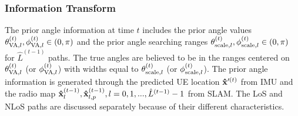\documentclass[journal,12pt,onecolumn,draftclsnofoot,]{IEEEtran}
\begin{document}
\subsubsection{Information Transform}
The prior angle information at time $t$ includes the prior angle values $\theta _{{\rm{VA}},l}^{(t )},\phi _{{\rm{VA}},l}^{(t )}\in (0,\pi )$ and the prior angle searching ranges $\theta _{{\rm{scale}},l}^{(t )},\phi _{{\rm{scale}},l}^{(t )}\in (0,\pi )$ for ${\hat L}^{({t - 1} )}$ paths. 
The true angles are believed to be in the ranges centered on $\theta _{{\rm{VA}},l}^{(t )}$ (or $\phi _{{\rm{VA}},l}^{(t )}$) with widths equal to $\theta _{{\rm{scale}},l}^{(t )}$ (or $\phi _{{\rm{scale}},l}^{(t )}$).
The prior angle information is generated through the predicted UE location ${\bf{\hat x}}{'^{(t )}}$ from IMU and the radio map ${\bf{\hat x}}_l^{({t - 1} )},{\bf{\hat x}}_{l,p}^{(t-1 )},l = 0,1, ...,{\hat L}^{({t - 1} )} - 1$ from SLAM. The LoS and NLoS paths are discussed separately because of their different characteristics.
\end{document}
